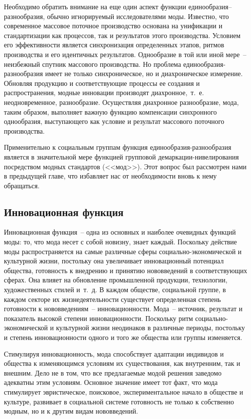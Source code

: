   Необходимо обратить внимание на еще один аспект функции
  единообразия--разнообразия, обычно игнорируемый исследователями моды.
  Известно, что современное массовое поточное производство основана на
  унификации и стандартизации как процессов, так и результатов этого
  производства. Условием его эффективности является синхронизация определенных
  этапов, ритмов производства и его идентичных результатов. Однообразие в той
  или иной мере~-- неизбежный спутник массового производства. Но проблема
  единообразия-разнообразия имеет не только синхроническое, но и диахроническое
  измерение. Обновляя продукцию и соответствующие процессы ее создания и
  распространения, модные инновации производят диахронное,~т.~е.
  неодновременное, разнообразие. Осуществляя диахронное разнообразие, мода,
  таким образом, выполняет важную функцию компенсации синхронного однообразия,
  выступающего как условие и результат массового поточного производства.
  
  Применительно к социальным группам функция единообразия-разнообразия является
  в значительной мере функцией групповой демаркации-нивелирования посредством
  модных стандартов (<<мод>>). Этот вопрос был рассмотрен нами в предыдущей
  главе, что избавляет нас от необходимости вновь к нему обращаться.
  
  \subsection{Инновационная функция}

  Инновационная функция~-- одна из основных и наиболее очевидных функций моды:
  то, что мода несет с собой новизну, знает каждый. Поскольку действие моды
  распространяется на самые различные сферы социально-экономической и культурной
  жизни, постольку она увеличивает инновационный потенциал общества, готовность
  к внедрению и принятию нововведений в соответствующих сферах. Она влияет на
  обновление промышленной продукции, технологии, художественных стилей и~т.~д. В
  каждом обществе, социальной группе, в каждом секторе их жизнедеятельности
  существует определенная степень готовности к нововведениям~-- инновационности.
  Мода~-- источник, результат и показатель высокой степени инновационности.
  Поскольку ритм социально-экономической и культурной жизни неодинаков в
  различные периоды, постольку и степень инновационности одного и того же
  общества или группы изменяется.
  
  Стимулируя инновационность, мода способствует адаптации индивидов и
  общества к изменяющимся условиям их существования, как внутренним, так и
  внешним. Дело не в том, что все предлагаемые модой решения заведомо адекватны
  этим условиям. Основное значение имеет тот факт, что мода стимулирует
  эвристическое, поисковое, экспериментальное начало в обществе и культуре,
  развивает в социальной системе готовность не только к собственно модным, но и
  к другим видам нововведений.
  
